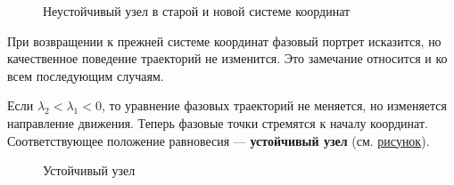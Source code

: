 \begin{figure}[H]\label{neustuzel}
    \caption{Неустойчивый узел в старой и новой системе координат}
\end{figure}

При возвращении к прежней системе координат фазовый портрет исказится, но качественное поведение траекторий не изменится. Это замечание относится и ко всем последующим случаям.

Если $\lambda_2 < \lambda_1 < 0$, то уравнение фазовых траекторий не меняется, но изменяется направление движения. Теперь фазовые точки стремятся к началу координат. Соответствующее положение равновесия --- \textbf{устойчивый узел} (см. \hyperref[ustuzel]{рисунок}).

\begin{figure}[H]\label{ustuzel}
    \caption{Устойчивый узел}
\end{figure}

